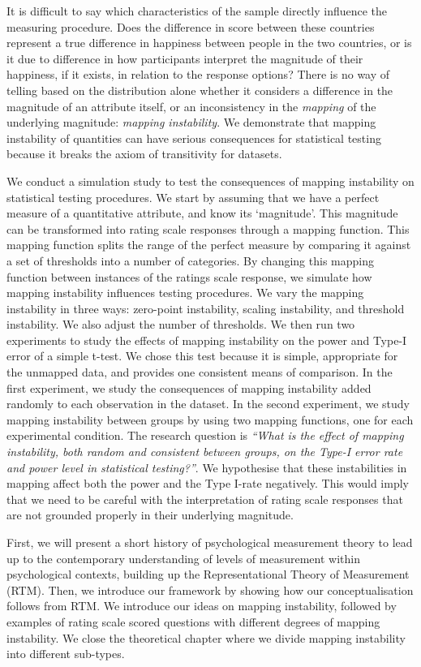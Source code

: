 \documentclass[titlepage, a4paper, 11pt]{article}
\begin{document}
It is difficult to say which characteristics of the sample directly influence the measuring procedure. Does the difference in score between these countries represent a true difference in happiness between people in the two countries, or is it due to difference in how participants interpret the magnitude of their happiness, if it exists, in relation to the response options? There is no way of telling based on the distribution alone whether it considers a difference in the magnitude of an attribute itself, or an inconsistency in the \textit{mapping} of the underlying magnitude: \textit{mapping instability}. We demonstrate that mapping instability of quantities can have serious consequences for statistical testing because it breaks the axiom of transitivity for datasets.

We conduct a simulation study to test the consequences of mapping instability on statistical testing procedures. We start by assuming that we have a perfect measure of a quantitative attribute, and know its `magnitude'. This magnitude can be transformed into rating scale responses through a mapping function. This mapping function splits the range of the perfect measure by comparing it against a set of thresholds into a number of categories. By changing this mapping function between instances of the ratings scale response, we simulate how mapping instability influences testing procedures. We vary the mapping instability in three ways: zero-point instability, scaling instability, and threshold instability. We also adjust the number of thresholds. We then run two experiments to study the effects of mapping instability on the power and Type-I error of a simple t-test. We chose this test because it is simple, appropriate for the unmapped data, and provides one consistent means of comparison. In the first experiment, we study the consequences of mapping instability added randomly to each observation in the dataset. In the second experiment, we study mapping instability between groups by using two mapping functions, one for each experimental condition. The research question is \textit{``What is the effect of mapping instability, both random and consistent between groups, on the Type-I error rate and power level in statistical testing?''}. We hypothesise that these instabilities in mapping affect both the power and the Type I-rate negatively. This would imply that we need to be careful with the interpretation of rating scale responses that are not grounded properly in their underlying magnitude. 

First, we will present a short history of psychological measurement theory to lead up to the contemporary understanding of levels of measurement within psychological contexts, building up the Representational Theory of Measurement (RTM). Then, we introduce our framework by showing how our conceptualisation follows from RTM. We introduce our ideas on mapping instability, followed by examples of rating scale scored questions with different degrees of mapping instability. We close the theoretical chapter where we divide mapping instability into different sub-types.
\end{document}
